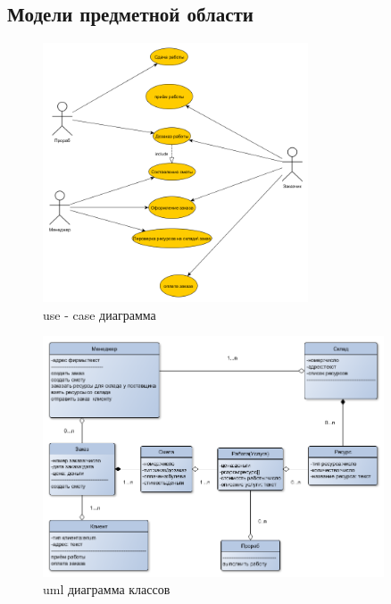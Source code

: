 \subsection{Модели предметной области}
\begin{figure}[!ht]
	\centering
	\includegraphics[width=0.7\textwidth]{img/uml_use_case.png}
	\caption{use - case диаграмма}
\end{figure}
\begin{figure}[!ht]
	\centering
	\includegraphics[width=0.9\textwidth]{img/uml_class_diagram.png}
	\caption{uml диаграмма классов}
\end{figure}
\newpage
